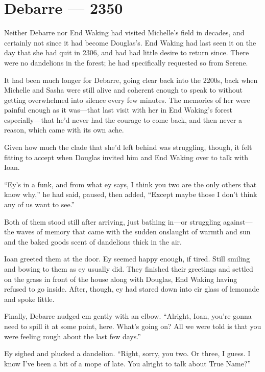 \hypertarget{debarre-2350}{%
\chapter{Debarre — 2350}\label{debarre-2350}}

Neither Debarre nor End Waking had visited Michelle's field in decades, and certainly not since it had become Douglas's. End Waking had last seen it on the day that she had quit in 2306, and had had little desire to return since. There were no dandelions in the forest; he had specifically requested so from Serene.

It had been much longer for Debarre, going clear back into the 2200s, back when Michelle and Sasha were still alive and coherent enough to speak to without getting overwhelmed into silence every few minutes. The memories of her were painful enough as it was—that last visit with her in End Waking's forest especially—that he'd never had the courage to come back, and then never a reason, which came with its own ache.

Given how much the clade that she'd left behind was struggling, though, it felt fitting to accept when Douglas invited him and End Waking over to talk with Ioan.

``Ey's in a funk, and from what ey says, I think you two are the only others that know why,'' he had said, paused, then added, ``Except maybe those I don't think any of us want to see.''

Both of them stood still after arriving, just bathing in—or struggling against—the waves of memory that came with the sudden onslaught of warmth and sun and the baked goods scent of dandelions thick in the air.

Ioan greeted them at the door. Ey seemed happy enough, if tired. Still smiling and bowing to them as ey usually did. They finished their greetings and settled on the grass in front of the house along with Douglas, End Waking having refused to go inside. After, though, ey had stared down into eir glass of lemonade and spoke little.

Finally, Debarre nudged em gently with an elbow. ``Alright, Ioan, you're gonna need to spill it at some point, here. What's going on? All we were told is that you were feeling rough about the last few days.''

Ey sighed and plucked a dandelion. ``Right, sorry, you two. Or three, I guess. I know I've been a bit of a mope of late. You alright to talk about True Name?''

